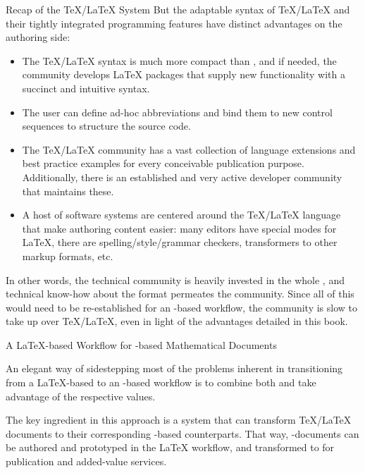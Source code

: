 \begin{omgroup}[id=stex,creators=miko]
\begin{omgroup}{Recap of the {\TeX/\LaTeX} System}
But the adaptable syntax of {\TeX/\LaTeX} and their tightly integrated programming
features have distinct advantages on the authoring side:
\begin{itemize}
\item The {\TeX/\LaTeX} syntax is much more compact than {\omdoc}, and if needed, the
  community develops {\LaTeX} packages that supply new functionality with a succinct and
  intuitive syntax.
\item The user can define ad-hoc abbreviations and bind them to new control sequences to
  structure the source code.
\item The {\TeX/\LaTeX} community has a vast collection of language extensions and best
  practice examples for every conceivable publication purpose. Additionally, there is an
  established and very active developer community that maintains these.
\item A host of software systems are centered around the {\TeX/\LaTeX} language that make
  authoring content easier: many editors have special modes for {\LaTeX}, there are
  spelling/style/grammar checkers, transformers to other markup formats, etc.
\end{itemize}
 
In other words, the technical community is heavily invested in the whole
{}, and technical know-how about the format permeates the
community. Since all of this would need to be re-established for an {\omdoc}-based
workflow, the community is slow to take up {\omdoc} over {\TeX/\LaTeX}, even in light of
the advantages detailed in this book.
\end{omgroup}

\begin{omgroup}{A {\LaTeX}-based Workflow for {\xml}-based Mathematical Documents}
 
  An elegant way of sidestepping most of the problems inherent in transitioning from a
  {\LaTeX}-based to an {\xml}-based workflow is to combine both and take advantage of the
  respective values.
 
  The key ingredient in this approach is a system that can transform {\TeX/\LaTeX}
  documents to their corresponding {\xml}-based counterparts. That way, {\xml}-documents
  can be authored and prototyped in the {\LaTeX} workflow, and transformed to {\xml} for
  publication and added-value services.
 

\end{omgroup}
\end{omgroup}
